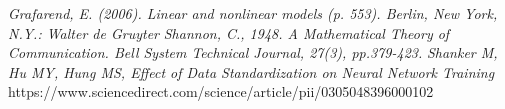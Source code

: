 \documentclass[11pt]{article}
\begin{document}
		 
		
	
	\pagebreak
	\begin{thebibliography}{1}	
		\textit{Grafarend, E. (2006). Linear and nonlinear models (p. 553). Berlin, New York, N.Y.: Walter de Gruyter}
		\textit{Shannon, C., 1948. A Mathematical Theory of Communication. Bell System Technical Journal, 27(3), pp.379-423.}
		\textit{Shanker M, Hu MY, Hung MS, Effect of Data Standardization on Neural Network Training} https://www.sciencedirect.com/science/article/pii/0305048396000102
		
		
		
	\end{thebibliography}
\end{document}
